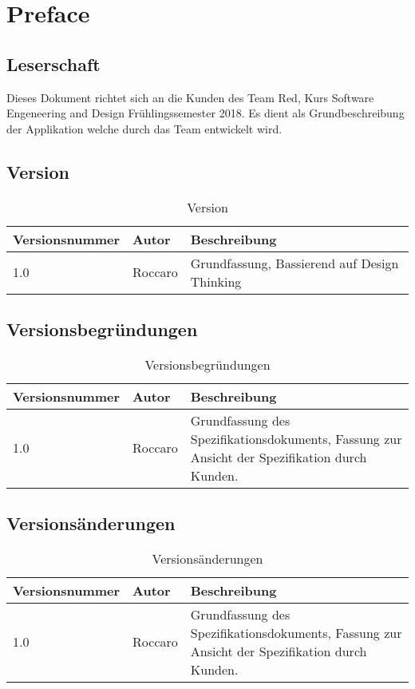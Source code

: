 \chapter{Preface}
\section{Leserschaft}

Dieses Dokument richtet sich an die Kunden des Team Red, Kurs Software
Engeneering and Design Frühlingssemester 2018. Es dient als
Grundbeschreibung der Applikation welche durch das Team entwickelt wird.

\section{Version}

\begin{table}[h]
 \caption{Version}
 \begin{tabularx}{\textwidth}{|l|l|X|}
     \hline
     \textbf{Versionsnummer}  & \textbf{Autor}  & \textbf{Beschreibung} \\
     \hline
     1.0                      & Roccaro         & Grundfassung, Bassierend auf Design Thinking \\
     \hline
 \end{tabularx}
 \label{table: Version}
\end{table}

\section{Versionsbegr\"{u}ndungen}

\begin{table}[h]
 \caption{Versionsbegr\"{u}ndungen}
 \begin{tabularx}{\linewidth}{|l|l|X|}
     \hline
     \textbf{Versionsnummer}  & \textbf{Autor}  & \textbf{Beschreibung} \\
     \hline
     1.0                      & Roccaro         & Grundfassung des
     Spezifikationsdokuments, Fassung zur Ansicht der Spezifikation durch Kunden. \\
     \hline
 \end{tabularx}
 \label{table: Versionsbegr\"{u}ndungen}
\end{table}

\section{Versions\"{a}nderungen}

\begin{table}[h]
 \caption{Versions\"{a}nderungen}
 \begin{tabularx}{\textwidth}{|l|l|X|}
     \hline
     \textbf{Versionsnummer}  & \textbf{Autor}  & \textbf{Beschreibung} \\
     \hline
     1.0                      & Roccaro         & Grundfassung des
     Spezifikationsdokuments, Fassung zur Ansicht der Spezifikation durch Kunden. \\
     \hline
 \end{tabularx}
 \label{table: Versions\"{a}nderungen}
\end{table}
